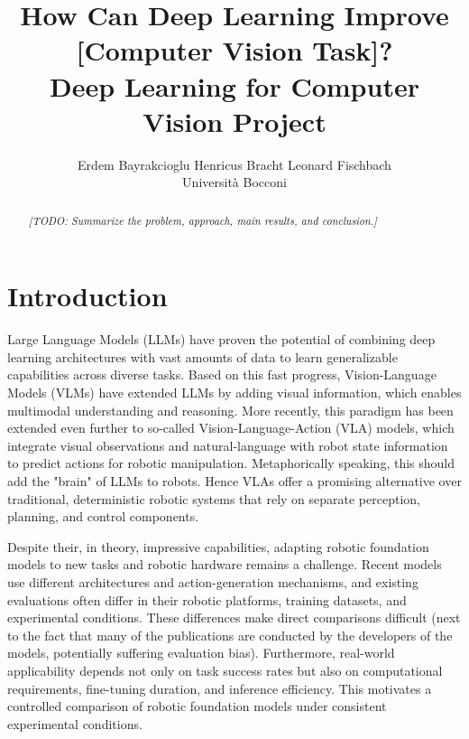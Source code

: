 \documentclass[10pt,twocolumn,letterpaper]{article}
\title{How Can Deep Learning Improve [Computer Vision Task]?\\[0.4em]
{\large Deep Learning for Computer Vision Project}}
\author{Erdem Bayrakcioglu \qquad Henricus Bracht \qquad Leonard Fischbach\\
Universit\`a Bocconi}
\newcommand{\papertodo}[1]{\textit{[TODO: #1]}}
\begin{document}
\maketitle
\linenumbers

\begin{abstract}
\papertodo{Summarize the problem, approach, main results, and conclusion.}
\end{abstract}

\section{Introduction}
Large Language Models (LLMs) have proven the potential of combining deep learning architectures with vast amounts of data to learn generalizable capabilities across diverse tasks. Based on this fast progress, Vision-Language Models (VLMs) have extended LLMs by adding visual information, which enables multimodal understanding and reasoning. More recently, this paradigm has been extended even further to so-called Vision-Language-Action (VLA) models, which integrate visual observations and natural-language with robot state information to predict actions for robotic manipulation. Metaphorically speaking, this should add the "brain" of LLMs to robots. Hence VLAs offer a promising alternative over traditional, deterministic robotic systems that rely on separate perception, planning, and control components.

Despite their, in theory, impressive capabilities, adapting robotic foundation models to new tasks and robotic hardware remains a challenge. Recent models use different architectures and action-generation mechanisms, and existing evaluations often differ in their robotic platforms, training datasets, and experimental conditions. These differences make direct comparisons difficult (next to the fact that many of the publications are conducted by the developers of the models, potentially suffering evaluation bias). Furthermore, real-world applicability depends not only on task success rates but also on computational requirements, fine-tuning duration, and inference efficiency. This motivates a controlled comparison of robotic foundation models under consistent experimental conditions.
\end{document}
